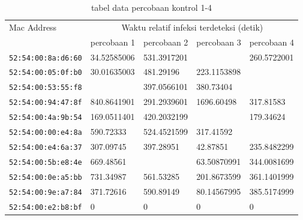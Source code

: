 \begin{table}[H]
	\caption{tabel data percobaan kontrol 1-4}
	\label{table:data percobaan kontrol 1_4}
	\centering
	\footnotesize
	\begin{tabular}{|l|l|l|l|l|}
		\hline
		\multirow{2}{*}{Mac Address} & \multicolumn{4}{c|}{Waktu relatif infeksi terdeteksi (detik)} \\ \cline{2-5} 
		& percobaan 1 & percobaan 2 & percobaan 3 & percobaan 4\\ \hline
		\verb|52:54:00:8a:d6:60| & 34.52585006 & 531.3917201 &  & 260.5722001 \\ \hline
		\verb|52:54:00:05:0f:b0| & 30.01635003 & 481.29196 & 223.1153898 &  \\ \hline
		\verb|52:54:00:53:55:f8| &  & 397.0566101 & 380.73404 &  \\ \hline
		\verb|52:54:00:94:47:8f| & 840.8641901 & 291.2939601 & 1696.60498 & 317.81583 \\ \hline
		\verb|52:54:00:4a:9b:54| & 169.0511401 & 420.2032199 &  & 179.34624 \\ \hline
		\verb|52:54:00:00:e4:8a| & 590.72333 & 524.4521599 & 317.41592 &  \\ \hline
		\verb|52:54:00:e4:6a:37| & 307.09745 & 397.28951 & 42.87851 & 235.8482299 \\ \hline
		\verb|52:54:00:5b:e8:4e| & 669.48561 &  & 63.50870991 & 344.0081699 \\ \hline
		\verb|52:54:00:0e:a5:bb| & 731.34987 & 561.53285 & 201.8673599 & 361.1401999 \\ \hline
		\verb|52:54:00:9e:a7:84| & 371.72616 & 590.89149 & 80.14567995 & 385.5174999 \\ \hline
		\verb|52:54:00:e2:b8:bf| & 0 & 0 & 0 & 0 \\ \hline
	\end{tabular}
\end{table}

